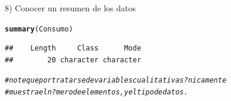 \documentclass[12pt,letterpaper]{article}\usepackage[]{graphicx}\usepackage[]{color}
\makeatletter
\newcommand{\hlcom}[1]{\textcolor[rgb]{0.678,0.584,0.686}{\textit{#1}}}%
\newcommand{\hlstd}[1]{\textcolor[rgb]{0.345,0.345,0.345}{#1}}%
\newcommand{\hlkwd}[1]{\textcolor[rgb]{0.737,0.353,0.396}{\textbf{#1}}}%
\newenvironment{kframe}{%
 \def\at@end@of@kframe{}%
 \ifinner\ifhmode%
  \def\at@end@of@kframe{\end{minipage}}%
  \begin{minipage}{\columnwidth}%
 \fi\fi%
 \def\FrameCommand##1{\hskip\@totalleftmargin \hskip-\fboxsep
 \colorbox{shadecolor}{##1}\hskip-\fboxsep
     \hskip-\linewidth \hskip-\@totalleftmargin \hskip\columnwidth}%
 \MakeFramed {\advance\hsize-\width
   \@totalleftmargin\z@ \linewidth\hsize
   \@setminipage}}%
 {\par\unskip\endMakeFramed%
 \at@end@of@kframe}
\newenvironment{knitrout}{}{} %
\makeatother
\begin{document}
8) Conocer un resumen de los datos
\begin{knitrout}
\color{fgcolor}\begin{kframe}
\begin{alltt}
\hlkwd{summary}\hlstd{(Consumo)}
\end{alltt}
\begin{verbatim}
##    Length     Class      Mode 
##        20 character character
\end{verbatim}
\begin{alltt}
\hlcom{# note que por tratarse de variables cualitativas ?nicamente }
\hlcom{# muestra el n?mero de elementos, y el tipo de datos.}
\end{alltt}
\end{kframe}
\end{knitrout}
\end{document}

